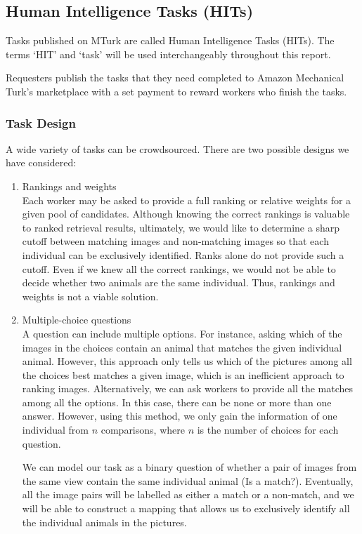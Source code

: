   \subsection{Human Intelligence Tasks (HITs)}

  Tasks published on MTurk are called Human Intelligence Tasks (HITs). The terms
  `HIT' and `task' will be used interchangeably throughout this report.

  Requesters publish the tasks that they need completed to Amazon Mechanical
  Turk's marketplace with a set payment to reward workers who finish the tasks.

  \subsubsection{Task Design}

  A wide variety of tasks can be crowdsourced. There are two possible designs we
  have considered:
  \begin{enumerate}
	\item Rankings and weights \\
    Each worker may be asked to provide a full ranking or relative weights
    for a given pool of candidates. Although knowing the correct rankings is
    valuable to ranked retrieval results,
    ultimately, we would like to determine a sharp cutoff between matching
    images and non-matching images so that each individual can be exclusively
    identified. Ranks alone do not provide such a cutoff. Even if we knew all the
    correct rankings, we would not be able to decide whether two animals are
    the same individual. Thus, rankings and weights is not a viable
    solution.
	\item Multiple-choice questions \\
    A question can include multiple options. For instance, asking which of the images
    in the choices contain an animal that matches the given individual
    animal. However, this approach only tells us which of the pictures among
    all the choices best matches a given image, which is an inefficient
    approach to ranking images. Alternatively, we can ask workers to provide
    all the matches among all the options. In this case, there can be none or
    more than one answer. However, using this method, we only gain the
    information of one individual from $n$ comparisons, where $n$ is the number
    of choices for each question.

    We can model our task as a binary question of whether a pair of images from
    the same view contain the same individual animal (Is a match?).
    Eventually, all the image pairs will be labelled as either a match or a
    non-match, and we will be able to construct a mapping that allows us to
    exclusively identify all the individual animals in the pictures.
  \end{enumerate}

